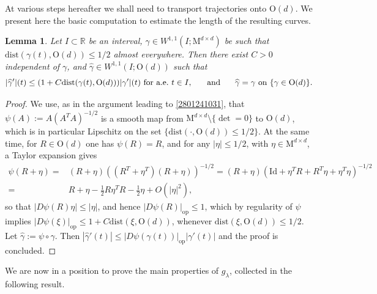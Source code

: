 \documentclass[a4paper,reqno]{amsart}
\newcommand\R{\mathbb{R}}
\newcommand\dist{{\mathrm{dist}}}
\newcommand\Id{{\mathrm{Id}}}
\newtheorem{lemma}[definition]{Lemma}
\theoremstyle{remark}
\newcommand{\On}{\mathrm{O}(d)}
\newcommand{\Mno}{\mathrm{M}^{d\times d}}
\numberwithin{equation}{section}
\begin{document}
At various steps hereafter we shall need to transport trajectories onto $\On$. We present here the basic computation to estimate the length of the resulting curves.
\begin{lemma}\label{lemmaprojOn}
 Let $I\subset\R$ be an interval, $\gamma\in W^{1,1}(I;\Mno)$ be such that
 $\dist(\gamma(t),\On)\le 1/2$ almost everywhere.
 Then there exist $C>0$ independent of $\gamma$, and  $\widehat\gamma\in W^{1,1}(I;\On)$
 such that
 \begin{equation}
  |\widehat\gamma'|(t)\le (1+C\dist(\gamma(t),\On)) |\gamma'|(t)\ \text{for a.e.}\ t\in I,\hskip5mm
  \text{ and }\hskip5mm
  \widehat\gamma=\gamma \text{ on } \{\gamma\in \On\}.
 \end{equation}
\end{lemma}
\begin{proof}
We use, as in the argument leading to \eqref{2801241031}, that $\psi(A):=A(A^TA)^{-1/2}$ is a smooth map from $\Mno\setminus\{\det=0\}$ to $\On$, which is in particular Lipschitz on the set
$\{\dist(\cdot,\On)\le 1/2\}$.
At the same time, for $R\in \On$
one has $\psi(R)=R$, and for any
$|\eta|\le 1/2$, with $\eta\in \Mno$, a Taylor expansion gives
\begin{equation}\begin{split}
 \psi(R+\eta)=&
 (R+\eta)\left((R^T+\eta^T)(R+\eta)\right)^{-1/2}
 =(R+\eta)(\Id+\eta^T R+ R^T\eta+\eta^T\eta)^{-1/2}\\
 =&R+\eta-\frac12 R\eta^T R-\frac12 \eta+O(|\eta|^2),
\end{split}\end{equation}
so that $|D\psi(R)\eta|\le |\eta|$, and hence $|D\psi(R)|_\mathrm{op}\leq 1$, which by regularity of $\psi$ implies
$|D\psi(\xi)|_\mathrm{op}\le 1+C\dist(\xi,\On)$,
whenever $\dist(\xi,\On)\le 1/2$.
Let $\widehat\gamma:=\psi\circ\gamma$.
Then $|\widehat\gamma'(t)|\le
|D\psi(\gamma(t))|_\mathrm{op}|\gamma'(t)|$ and the proof is concluded.
\end{proof}

We are now in a position to prove the main properties of $g_\lambda$, collected in the following result.
\end{document}
